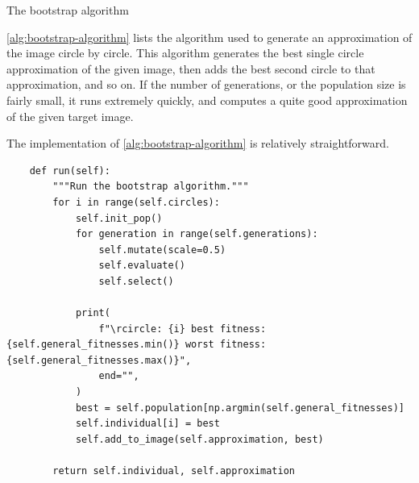 \documentclass{article}
\begin{document}
\begin{algorithm}[h]
    \begin{algorithmic}
                \EndFor
            \EndFor
            \State{}
        \EndFunction{}
    \end{algorithmic}
    \caption{The bootstrap algorithm}\label{alg:bootstrap-algorithm}
\end{algorithm}

\autoref{alg:bootstrap-algorithm} lists the algorithm used to generate an approximation of the
image circle by circle. This algorithm generates the best single circle approximation of the given
image, then adds the best second circle to that approximation, and so on. If the number of
generations, or the population size is fairly small, it runs extremely quickly, and computes a
quite good approximation of the given target image.

The implementation of \autoref{alg:bootstrap-algorithm} is relatively straightforward.

\begin{verbatim}
    def run(self):
        """Run the bootstrap algorithm."""
        for i in range(self.circles):
            self.init_pop()
            for generation in range(self.generations):
                self.mutate(scale=0.5)
                self.evaluate()
                self.select()

            print(
                f"\rcircle: {i} best fitness: {self.general_fitnesses.min()} worst fitness: {self.general_fitnesses.max()}",
                end="",
            )
            best = self.population[np.argmin(self.general_fitnesses)]
            self.individual[i] = best
            self.add_to_image(self.approximation, best)

        return self.individual, self.approximation
\end{verbatim}
\end{document}

